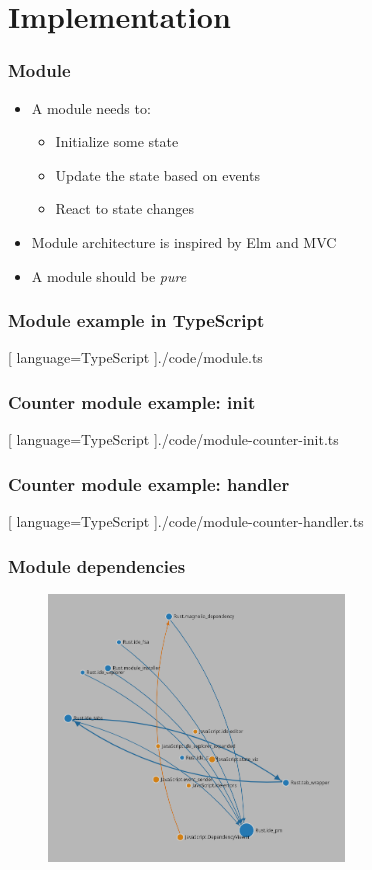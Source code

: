 \section{Implementation}
\SectionPage

\begin{frame}
  \frametitle{Module}
  \begin{itemize}
    \pause
    \item A module needs to:
      \pause
      \begin{itemize}
        \item Initialize some state
        \pause
        \item Update the state based on events
        \pause
        \item React to state changes
      \end{itemize}
      \pause
    \item Module architecture is inspired by Elm and MVC
      \pause
    \item A module should be \textit{pure}
  \end{itemize}
\end{frame}

\begin{frame}
  \frametitle{Module example in TypeScript}
  \begin{center}
    
    [ language=TypeScript
    ]{./code/module.ts}
  \end{center}
\end{frame}

\begin{frame}
  \frametitle{Counter module example: init}
  \begin{center}
    
    [ language=TypeScript
    ]{./code/module-counter-init.ts}
  \end{center}
\end{frame}

\begin{frame}
  \frametitle{Counter module example: handler}
  \begin{center}
    
    [ language=TypeScript
    ]{./code/module-counter-handler.ts}
  \end{center}
\end{frame}


\begin{frame}
  \frametitle{Module dependencies}
  \begin{figure}
    \centering
      \includegraphics[width=0.7\textwidth]{./pics/module-dependencies.png}
  \end{figure}
\end{frame}

